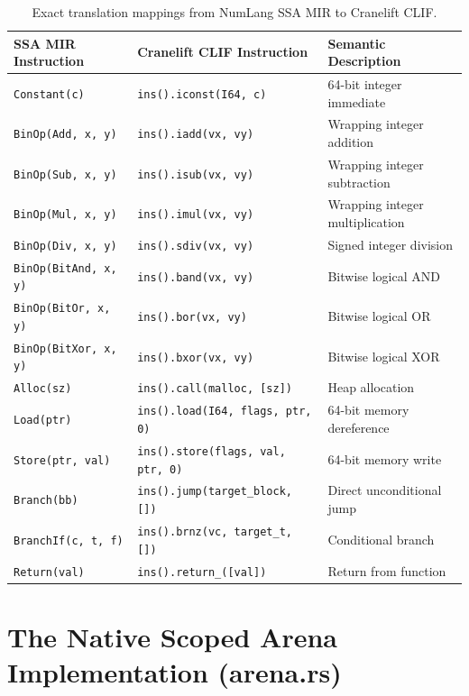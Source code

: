 \begin{table}[h!]
\centering
\small
\begin{tabular}{lll}
\toprule
\textbf{SSA MIR Instruction} & \textbf{Cranelift CLIF Instruction} & \textbf{Semantic Description} \\
\midrule
\texttt{Constant(c)} & \texttt{ins().iconst(I64, c)} & 64-bit integer immediate \\
\texttt{BinOp(Add, x, y)} & \texttt{ins().iadd(vx, vy)} & Wrapping integer addition \\
\texttt{BinOp(Sub, x, y)} & \texttt{ins().isub(vx, vy)} & Wrapping integer subtraction \\
\texttt{BinOp(Mul, x, y)} & \texttt{ins().imul(vx, vy)} & Wrapping integer multiplication \\
\texttt{BinOp(Div, x, y)} & \texttt{ins().sdiv(vx, vy)} & Signed integer division \\
\texttt{BinOp(BitAnd, x, y)} & \texttt{ins().band(vx, vy)} & Bitwise logical AND \\
\texttt{BinOp(BitOr, x, y)} & \texttt{ins().bor(vx, vy)} & Bitwise logical OR \\
\texttt{BinOp(BitXor, x, y)} & \texttt{ins().bxor(vx, vy)} & Bitwise logical XOR \\
\texttt{Alloc(sz)} & \texttt{ins().call(malloc, [sz])} & Heap allocation \\
\texttt{Load(ptr)} & \texttt{ins().load(I64, flags, ptr, 0)} & 64-bit memory dereference \\
\texttt{Store(ptr, val)} & \texttt{ins().store(flags, val, ptr, 0)} & 64-bit memory write \\
\texttt{Branch(bb)} & \texttt{ins().jump(target\_block, [])} & Direct unconditional jump \\
\texttt{BranchIf(c, t, f)} & \texttt{ins().brnz(vc, target\_t, [])} & Conditional branch \\
\texttt{Return(val)} & \texttt{ins().return\_([val])} & Return from function \\
\bottomrule
\end{tabular}
\caption{Exact translation mappings from NumLang SSA MIR to Cranelift CLIF.}
\label{tab:clif_lowering}
\end{table}

\section{The Native Scoped Arena Implementation (arena.rs)}
\label{sec:cranelift:arena_code}

